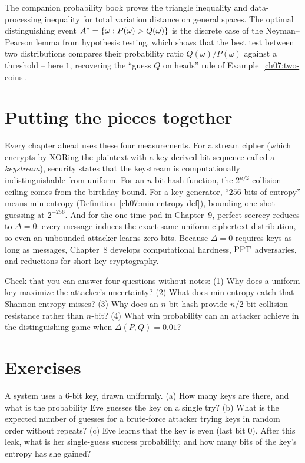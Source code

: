 \begin{connectionbox}
The companion probability book proves the triangle inequality and data-processing inequality for total variation distance on general spaces. The optimal distinguishing event $A^* = \{\omega : P(\omega) > Q(\omega)\}$ is the discrete case of the Neyman--Pearson lemma from hypothesis testing, which shows that the best test between two distributions compares their probability ratio $Q(\omega)/P(\omega)$ against a threshold -- here $1$, recovering the ``guess $Q$ on heads'' rule of Example~\ref{ch07:two-coins}.
\end{connectionbox}

\section{Putting the pieces together}

Every chapter ahead uses these four measurements. For a stream cipher (which encrypts by XORing the plaintext with a key-derived bit sequence called a \emph{keystream}), security states that the keystream is computationally indistinguishable from uniform. For an $n$-bit hash function, the $2^{n/2}$ collision ceiling comes from the birthday bound. For a key generator, ``$256$ bits of entropy'' means min-entropy (Definition~\ref{ch07:min-entropy-def}), bounding one-shot guessing at $2^{-256}$. And for the one-time pad in Chapter~9, perfect secrecy reduces to $\Delta = 0$: every message induces the exact same uniform ciphertext distribution, so even an unbounded attacker learns zero bits. Because $\Delta = 0$ requires keys as long as messages, Chapter~8 develops computational hardness, $\mathrm{PPT}$ adversaries, and reductions for short-key cryptography.

\begin{recoverybox}
Check that you can answer four questions without notes: (1) Why does a uniform key maximize the attacker's uncertainty? (2) What does min-entropy catch that Shannon entropy misses? (3) Why does an $n$-bit hash provide $n/2$-bit collision resistance rather than $n$-bit? (4) What win probability can an attacker achieve in the distinguishing game when $\Delta(P, Q) = 0.01$?
\end{recoverybox}

\section{Exercises}

\begin{exercise}
\label{ch07:ex-uniform}
A system uses a $6$-bit key, drawn uniformly. (a) How many keys are there, and what is the probability Eve guesses the key on a single try? (b) What is the expected number of guesses for a brute-force attacker trying keys in random order without repeats? (c) Eve learns that the key is even (last bit $0$). After this leak, what is her single-guess success probability, and how many bits of the key's entropy has she gained?
\end{exercise}

